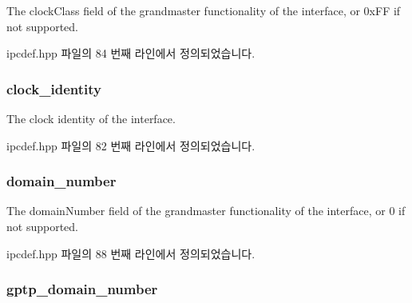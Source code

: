 The clock\+Class field of the grandmaster functionality of the interface, or 0x\+FF if not supported. 



ipcdef.\+hpp 파일의 84 번째 라인에서 정의되었습니다.

\subsubsection[{\texorpdfstring{clock\+\_\+identity}{clock_identity}}]{ clock\+\_\+identity}\hypertarget{structg_ptp_time_data_af57b2186850d88240e6095da54758a2e}{}\label{structg_ptp_time_data_af57b2186850d88240e6095da54758a2e}


The clock identity of the interface. 



ipcdef.\+hpp 파일의 82 번째 라인에서 정의되었습니다.

\subsubsection[{\texorpdfstring{domain\+\_\+number}{domain_number}}]{ domain\+\_\+number}\hypertarget{structg_ptp_time_data_a96702548f5b9222af26319c695764b29}{}\label{structg_ptp_time_data_a96702548f5b9222af26319c695764b29}


The domain\+Number field of the grandmaster functionality of the interface, or 0 if not supported. 



ipcdef.\+hpp 파일의 88 번째 라인에서 정의되었습니다.

\subsubsection[{\texorpdfstring{gptp\+\_\+domain\+\_\+number}{gptp_domain_number}}]{ gptp\+\_\+domain\+\_\+number}\hypertarget{structg_ptp_time_data_ac53b4e61c0f960e16c86cfe678ca256d}{}\label{structg_ptp_time_data_ac53b4e61c0f960e16c86cfe678ca256d}


